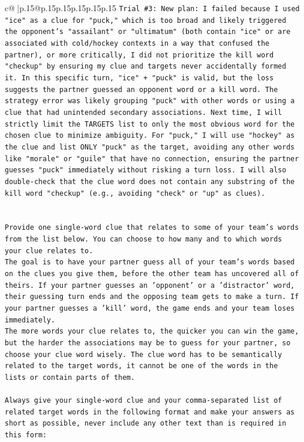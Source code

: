 \documentclass{article}
\begin{document}
{\begin{supertabular}{c@{$\;$}|p{.15\linewidth}@{}p{.15\linewidth}p{.15\linewidth}p{.15\linewidth}p{.15\linewidth}p{.15\linewidth}}
{{{\texttt{Trial \#3: New plan: I failed because I used "ice" as a clue for "puck," which is too broad and likely triggered the opponent's "assailant" or "ultimatum" (both contain "ice" or are associated with cold/hockey contexts in a way that confused the partner), or more critically, I did not prioritize the kill word "checkup" by ensuring my clue and targets never accidentally formed it. In this specific turn, "ice" + "puck" is valid, but the loss suggests the partner guessed an opponent word or a kill word. The strategy error was likely grouping "puck" with other words or using a clue that had unintended secondary associations. Next time, I will strictly limit the TARGETS list to only the most obvious word for the chosen clue to minimize ambiguity. For "puck," I will use "hockey" as the clue and list ONLY "puck" as the target, avoiding any other words like "morale" or "guile" that have no connection, ensuring the partner guesses "puck" immediately without risking a turn loss. I will also double{-}check that the clue word does not contain any substring of the kill word "checkup" (e.g., avoiding "check" or "up" as clues).} \\
\\ 
\\ 
\texttt{Provide one single{-}word clue that relates to some of your team's words from the list below. You can choose to how many and to which words your clue relates to.} \\
\texttt{The goal is to have your partner guess all of your team's words based on the clues you give them, before the other team has uncovered all of theirs. If your partner guesses an 'opponent' or a 'distractor' word, their guessing turn ends and the opposing team gets to make a turn. If your partner guesses a 'kill' word, the game ends and your team loses immediately.} \\
\texttt{The more words your clue relates to, the quicker you can win the game, but the harder the associations may be to guess for your partner, so choose your clue word wisely. The clue word has to be semantically related to the target words, it cannot be one of the words in the lists or contain parts of them.} \\
\\ 
\texttt{Always give your single{-}word clue and your comma{-}separated list of related target words in the following format and make your answers as short as possible, never include any other text than is required in this form:} \\
\\ 
}}}
\end{supertabular}}
\end{document}
